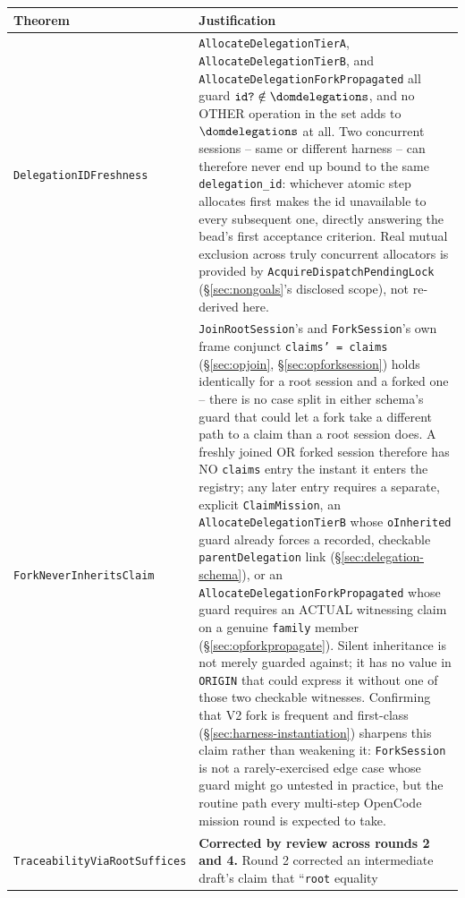 \documentclass[a4paper,10pt,fleqn]{article}
\newcommand{\field}[1]{\texttt{#1}}
\begin{document}
\begin{center}
\begin{tabularx}{\textwidth}{@{}lX@{}}
\toprule
\textbf{Theorem} & \textbf{Justification} \\
\midrule
\field{DelegationIDFreshness} &
  \field{AllocateDelegationTierA}, \field{AllocateDelegationTierB}, and
  \field{AllocateDelegationForkPropagated} all guard
  $\field{id?} \notin \dom \field{delegations}$, and no OTHER operation in the set
  adds to $\dom \field{delegations}$ at all. Two concurrent
  sessions -- same or different harness -- can therefore never end up
  bound to the same \field{delegation\_id}: whichever atomic step
  allocates first makes the id unavailable to every subsequent one,
  directly answering the bead's first acceptance criterion. Real
  mutual exclusion across truly concurrent allocators is provided by
  \field{AcquireDispatchPendingLock} (\S\ref{sec:nongoals}'s disclosed
  scope), not re-derived here. \\
\field{ForkNeverInheritsClaim} &
  \field{JoinRootSession}'s and \field{ForkSession}'s own frame
  conjunct \field{claims' = claims} (\S\ref{sec:opjoin},
  \S\ref{sec:opforksession}) holds identically for a root session and a
  forked one -- there is no case split in either schema's guard that
  could let a fork take a different path to a claim than a root session
  does. A freshly joined OR forked session therefore has NO
  \field{claims} entry the instant it enters the registry; any later
  entry requires a separate, explicit \field{ClaimMission}, an
  \field{AllocateDelegationTierB} whose \field{oInherited} guard already
  forces a recorded, checkable \field{parentDelegation} link
  (\S\ref{sec:delegation-schema}), or an
  \field{AllocateDelegationForkPropagated} whose guard requires an
  ACTUAL witnessing claim on a genuine \field{family} member
  (\S\ref{sec:opforkpropagate}). Silent inheritance is not merely
  guarded against; it has no value in \field{ORIGIN} that could express
  it without one of those two checkable witnesses. Confirming that V2
  fork is frequent and first-class (\S\ref{sec:harness-instantiation})
  sharpens this claim rather than weakening it: \field{ForkSession} is
  not a rarely-exercised edge case whose guard might go untested in
  practice, but the routine path every multi-step OpenCode mission round
  is expected to take. \\
\field{TraceabilityViaRootSuffices} &
  \textbf{Corrected by review across rounds 2 and 4.} Round 2
  corrected an intermediate draft's claim that ``\field{root} equality

\end{tabularx}
\end{center}
\end{document}
